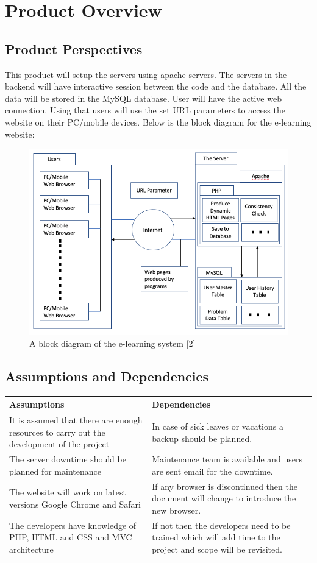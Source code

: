 \documentclass{article}
\begin{document}
\section{Product Overview}

\subsection{Product Perspectives}
This product will setup the servers using apache servers. The servers in the backend will have interactive session between the code and the database. All the data will be stored in the MySQL database. User will have the active web connection. Using that users will use the set URL parameters to access the website on their PC/mobile devices. Below is the block diagram for the e-learning website:
\begin{figure}[htb!]
    \centering
    \includegraphics[scale=0.4]{1.png}
    \caption{A block diagram of the e-learning system [2] }
    \label{fig:my_label}
\end{figure}


\subsection{Assumptions and Dependencies}

\begin{tabular}{|p{5.5cm}|p{6.5cm}|}
\hline
\textbf{Assumptions} & \textbf{Dependencies} \\ \hline
It is assumed that there are enough resources to carry out the development of the project & In case of sick leaves or vacations a backup should be planned.\\ \hline
The server downtime should be planned for maintenance & Maintenance team is available and users are sent email for the downtime.\\ \hline
The website will work on latest versions Google Chrome and Safari & If any browser is discontinued then the document will change to introduce the new browser.\\ \hline
The developers have knowledge of PHP, HTML and CSS and MVC architecture & If not then the developers need to be trained which will add time to the project and scope will be revisited.\\ \hline

\end{tabular}
\end{document}
